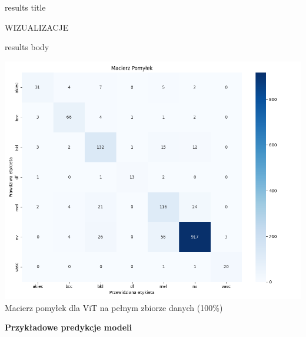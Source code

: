 \documentclass[final]{beamer}
\begin{document}
\begin{frame}[t]
\begin{columns}[T]
        \begin{column}{.49\linewidth}
            {%
            \vspace{0.1cm}
            \begin{beamercolorbox}[wd=\linewidth,center]{results title}
            
                \large WIZUALIZACJE
                \vspace{0.3cm}
            \end{beamercolorbox}}
            {%
            \begin{beamercolorbox}[wd=\linewidth,dp=0.3cm]{results body}

                \begin{center}
                    \includegraphics[width=0.9\linewidth]{figures/confusion_matrix_vit.png}\\
                    {\small Macierz pomyłek dla ViT na pełnym zbiorze danych (100\%)}
                \end{center}
                
                \vspace{0.15cm}
                \textbf{Przykładowe predykcje modeli}
                \vspace{0.1cm}
                

\end{beamercolorbox}}
\end{column}
\end{columns}
\end{frame}
\end{document}

